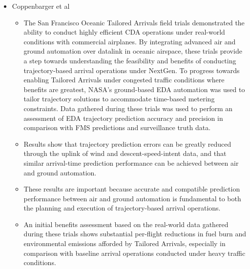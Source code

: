 \documentclass{aer1315-pretty}
\begin{document}
\begin{itemize}
\item Coppenbarger et al \cite{Copp:2007} 
\begin{itemize}
\item   The San Francisco Oceanic Tailored Arrivals field trials demonstrated the ability to conduct highly efficient CDA operations under real-world conditions with commercial airplanes. By integrating advanced air and ground automation over datalink in oceanic airspace, these trials provide a step towards understanding the feasibility and benefits of conducting trajectory-based arrival operations under NextGen. To progress towards enabling Tailored Arrivals under congested traffic conditions where benefits are greatest, NASA’s ground-based EDA automation was used to tailor trajectory solutions to accommodate time-based metering constraints. Data gathered during these trials was used to perform an assessment of EDA trajectory prediction accuracy and precision in comparison with FMS predictions and surveillance truth data. 
\item Results show that trajectory prediction errors can be greatly reduced through the uplink of wind and descent-speed-intent data, and that similar arrival-time prediction performance can be achieved between air and ground automation. 
\item These results are important because accurate and compatible prediction performance between air and ground automation is fundamental to both the planning and execution of trajectory-based arrival operations. 
\item An initial benefits assessment based on the real-world data gathered during these trials shows substantial per-flight reductions in fuel burn and environmental emissions afforded by Tailored Arrivals, especially in comparison with baseline arrival operations conducted under heavy traffic conditions. 
\end{itemize}


\end{itemize}
\end{document}
